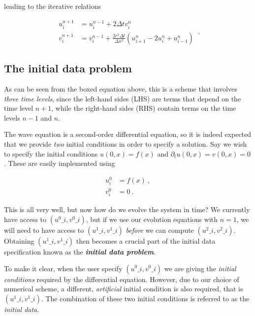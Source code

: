 \documentclass[a4paper,11pt]{article}
\begin{document}
\noindent leading to the iterative relations

\begin{equation}
\boxed{
\begin{aligned}
u^{n+1}_{i} &= u^{n-1}_{i} + 2\Delta t v^{n}_{i}\\
v^{n+1}_{i} &= v^{n-1}_{i} + \frac{2c^{2}\Delta t}{\Delta x^{2}}\left(u^{n}_{i+1}-2u^{n}_{i}+u^{n}_{i-1}\right)
\end{aligned}
}\ .
\end{equation}

\subsection{The initial data problem}

As can be seen from the boxed equation above, this is a scheme that involves \emph{three time levels}, since the left-hand sides (LHS) are terms that depend on the time level $n+1$, while the right-hand sides (RHS) contain terms on the time levels $n-1$ and $n$.

The wave equation is a second-order differential equation, so it is indeed expected that we provide \emph{two} initial conditions in order to specify a solution. Say we wish to specify the initial conditions $u(0,x) = f(x)$ and $\partial_{t}u(0,x) = v(0,x) = 0$. These are easily implemented using

\begin{equation}
\begin{aligned}
u_{i}^{0} &= f(x)\ ,\\
v_{i}^{0} &= 0\ .
\end{aligned}
\end{equation}

This is all very well, but now how do we evolve the system in time? We currently have access to $\left(u^{0}\_{i},v^{0}\_{i}\right)$, but if we use our evolution equations with $n=1$, we will need to have access to $\left(u^{1}\_{i},v^{1}\_{i}\right)$ \emph{before} we can compute $\left(u^{2}\_{i},v^{2}\_{i}\right)$. Obtaining $\left(u^{1}\_{i},v^{1}\_{i}\right)$ then becomes a crucial part of the initial data specification known as the \emph{\textbf{initial data problem}}.

To make it clear, when the user specify $\left(u^{0}\_{i},v^{0}\_{i}\right)$ we are giving the \emph{initial conditions} required by the differential equation. However, due to our choice of numerical scheme, a different, \emph{artificial} initial condition is also required, that is $\left(u^{1}\_{i},v^{1}\_{i}\right)$. The combination of these two initial conditions is referred to as the \emph{initial data}.
\end{document}
